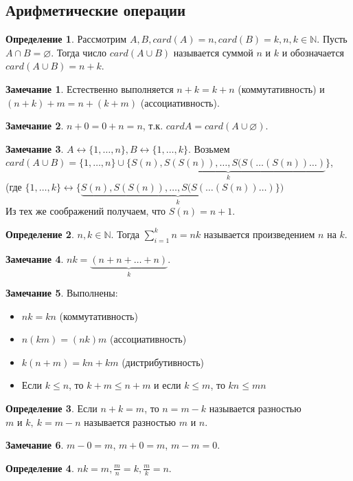 \documentclass[a4paper, 12pt]{article}
\newcommand{\N}{\mathbb{N}}
\renewcommand{\emptyset}{\varnothing}
\theoremstyle{definition}
\newtheorem*{definition}{Определение}
\newtheorem*{comm}{Замечание}
\begin{document}
    \subsection{Арифметические операции}
        \begin{definition}
            Рассмотрим $A,B, card(A)=n, card(B)=k, n,k\in \N$. Пусть $A\cap B=\emptyset$. Тогда число $card(A\cup B)$ называется суммой $n$ и $k$ и обозначается $card(A\cup B)=n+k$.
        \end{definition}
        \begin{comm}
            Естественно выполняется $n+k=k+n$ (коммутативность) и\\ $(n+k)+m=n+(k+m)$ (ассоциативность).
        \end{comm}
        \begin{comm}
            $n+0=0+n=n$, т.к. $cardA=card(A\cup \emptyset)$.
        \end{comm}
        \begin{comm}
            $A \leftrightarrow \{1,\dots, n\}, B\leftrightarrow \{1,\dots, k\}$. Возьмем\\ $card(A\cup B)=\{1,\dots, n\}\cup \{\underbrace{S(n), S(S(n)), \dots, S(S(\dots (S(n))\dots)}_k\}$,\\ (где $\{1,\dots, k\} \leftrightarrow \{\underbrace{S(n), S(S(n)), \dots, S(S(\dots (S(n))\dots)}_k\})$\\
            Из тех же соображений получаем, что $S(n)=n+1$.
        \end{comm} 
        \begin{definition}
            $n,k\in \N$. Тогда $\sum\limits_{i=1}^kn=nk$ называется произведением $n$ на $k$.
        \end{definition}
        \begin{comm}
            $nk=\underbrace{(n+n+\dots +n)}_k$. 
        \end{comm}
        \begin{comm} Выполнены:
            \begin{itemize}
                \item $nk=kn$ (коммутативность)
                \item $n(km)=(nk)m$ (ассоциативность)
                \item $k(n+m)=kn+km$ (дистрибутивность)
                \item Если $k\leq n$, то $k+m\leq n+m$ и если $k\leq m$, то $kn\leq mn$
            \end{itemize}
        \end{comm}
        \begin{definition}
            Если $n+k=m$, то $n=m-k$ называется разностью\\ $m$ и $k,\ k=m-n$ называется разностью $m$ и $n$.
        \end{definition}
        \begin{comm}
            $m-0=m$, $m+0=m$, $m-m=0$.
        \end{comm}
        \begin{definition}
            $nk=m, \frac{m}{n}=k, \frac{m}{k}=n$.
        \end{definition}
\end{document}
